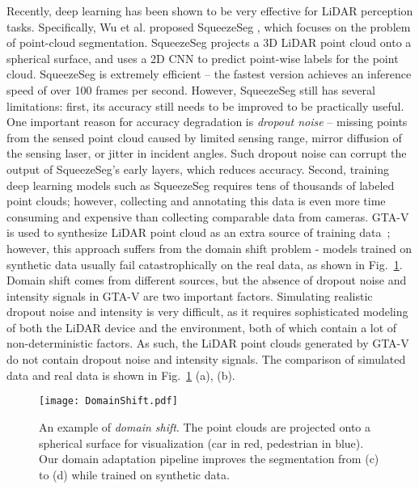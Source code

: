 \documentclass[letterpaper, 10 pt, conference]{ieeeconf}
\begin{document}
Recently, deep learning has been shown to be very effective for LiDAR perception tasks. Specifically, Wu et al. proposed SqueezeSeg \cite{wu2017squeezeseg}, which focuses on the problem of point-cloud segmentation. SqueezeSeg projects a 3D LiDAR point cloud onto a spherical surface, and uses a 2D CNN to predict point-wise labels for the point cloud. SqueezeSeg is extremely efficient -- the fastest version achieves an inference speed of over 100 frames per second. However, SqueezeSeg still has several limitations: first, its accuracy still needs to be improved to be practically useful. One important reason for accuracy degradation is \textit{dropout noise} -- missing points from the sensed point cloud caused by limited sensing range, mirror diffusion of the sensing laser, or jitter in incident angles. Such dropout noise can corrupt the output of SqueezeSeg's early layers, which reduces accuracy. Second, training deep learning models such as SqueezeSeg requires tens of thousands of labeled point clouds; however, collecting and annotating this data is even more time consuming and expensive than collecting comparable data from cameras. GTA-V is used to synthesize LiDAR point cloud as an extra source of training data~\cite{wu2017squeezeseg}; however, this approach suffers from the domain shift problem \cite{torralba2011unbiased} -  models trained on synthetic data usually fail catastrophically on the real data, as shown in Fig.~\ref{fig:DomainShift}. Domain shift comes from different sources, but the absence of dropout noise and intensity signals in GTA-V are two important factors. Simulating realistic dropout noise and intensity is very difficult, as it requires sophisticated modeling of both the LiDAR device and the environment, both of which contain a lot of non-deterministic factors. As such, the LiDAR point clouds generated by GTA-V do not contain dropout noise and intensity signals. The comparison of simulated data and real data is shown in Fig.~\ref{fig:DomainShift} (a), (b).

\begin{figure}[!t]
\begin{center}
\centering \texttt{[image: DomainShift.pdf]}
\caption{An example of \emph{domain shift}. The point clouds are projected onto a spherical surface for visualization (car in red, pedestrian in blue). Our domain adaptation pipeline improves the segmentation from (c) to (d) while trained on synthetic data.}

\vspace{-0.9cm}
\label{fig:DomainShift}
\end{center}
\end{figure}
\end{document}
